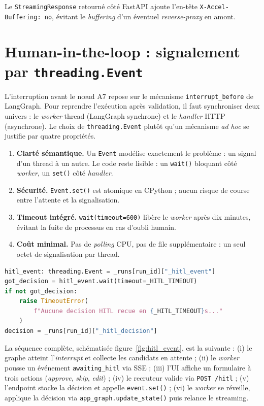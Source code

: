 Le \texttt{StreamingResponse} retourné côté FastAPI ajoute l'en-tête \texttt{X-Accel-Buffering: no}, évitant le \textit{buffering} d'un éventuel \textit{reverse-proxy} en amont.

\section{Human-in-the-loop : signalement par \texttt{threading.Event}}

L'interruption avant le nœud A7 repose sur le mécanisme \texttt{interrupt\_before} de LangGraph. Pour reprendre l'exécution après validation, il faut synchroniser deux univers : le \textit{worker} thread (LangGraph synchrone) et le \textit{handler} HTTP (asynchrone). Le choix de \texttt{threading.Event} plutôt qu'un mécanisme \textit{ad hoc} se justifie par quatre propriétés.

\begin{enumerate}
\item \textbf{Clarté sémantique.} Un \texttt{Event} modélise exactement le problème : un signal d'un thread à un autre. Le code reste lisible : un \texttt{wait()} bloquant côté \textit{worker}, un \texttt{set()} côté \textit{handler}.
\item \textbf{Sécurité.} \texttt{Event.set()} est atomique en CPython ; aucun risque de course entre l'attente et la signalisation.
\item \textbf{Timeout intégré.} \texttt{wait(timeout=600)} libère le \textit{worker} après dix minutes, évitant la fuite de processus en cas d'oubli humain.
\item \textbf{Coût minimal.} Pas de \textit{polling} CPU, pas de file supplémentaire : un seul octet de signalisation par thread.
\end{enumerate}

\begin{lstlisting}[language=Python,caption={Attente bloquante du worker sur la décision HITL (\texttt{src/api.py})}]
hitl_event: threading.Event = _runs[run_id]["_hitl_event"]
got_decision = hitl_event.wait(timeout=_HITL_TIMEOUT)
if not got_decision:
    raise TimeoutError(
        f"Aucune decision HITL recue en {_HITL_TIMEOUT}s..."
    )
decision = _runs[run_id]["_hitl_decision"]
\end{lstlisting}

La séquence complète, schématisée figure~\ref{fig:hitl_event}, est la suivante : (i) le graphe atteint l'\textit{interrupt} et collecte les candidats en attente ; (ii) le \textit{worker} pousse un événement \texttt{awaiting\_hitl} via SSE ; (iii) l'UI affiche un formulaire à trois actions (\textit{approve}, \textit{skip}, \textit{edit}) ; (iv) le recruteur valide via \texttt{POST /hitl} ; (v) l'endpoint stocke la décision et appelle \texttt{event.set()} ; (vi) le \textit{worker} se réveille, applique la décision via \texttt{app\_graph.update\_state()} puis relance le streaming.

